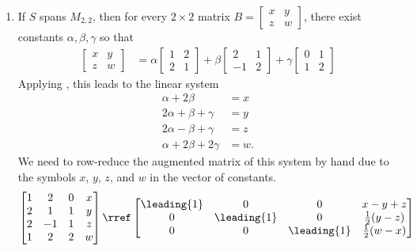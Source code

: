 \begin{enumerate}
\item
If $S$ spans $M_{2,2}$, then for every $2 \times 2$ matrix 
$B = \begin{bmatrix}x & y \\ z & w\end{bmatrix}$, 
there exist constants $\alpha, \beta, \gamma$ so that 
%
\begin{align*}
\begin{bmatrix}x & y \\ z & w\end{bmatrix} 
&= 
\alpha\begin{bmatrix} 1& 2\\2 & 1 \end{bmatrix} + 
\beta\begin{bmatrix} 2 & 1\\ -1 & 2\end{bmatrix} + 
\gamma\begin{bmatrix} 0 & 1\\ 1 & 2\end{bmatrix}
\end{align*}
%  
Applying , this leads to the linear system
\begin{align*}
\alpha + 2\beta  &= x\\
2\alpha + \beta + \gamma &= y\\
2\alpha - \beta + \gamma &= z\\
\alpha + 2\beta + 2\gamma &= w.
\end{align*}
We need to row-reduce the augmented matrix of this system by hand due to the symbols $x$, $y$, $z$, and $w$ in the vector of constants.
%
\begin{align*}
\begin{bmatrix} 
1 & 2 & 0 & x\\ 
2 & 1 & 1 & y\\
2 & -1 & 1 & z\\ 
1 & 2 & 2 & w
\end{bmatrix} 
\rref 
\begin{bmatrix} 
\leading{1} & 0 & 0 & x - y + z\\
0 & \leading{1} & 0 & \frac{1}{2}(y - z)\\
0 & 0 & \leading{1} & \frac{1}{2}(w - x)\\

\end{bmatrix}
\end{align*}
\end{enumerate}
